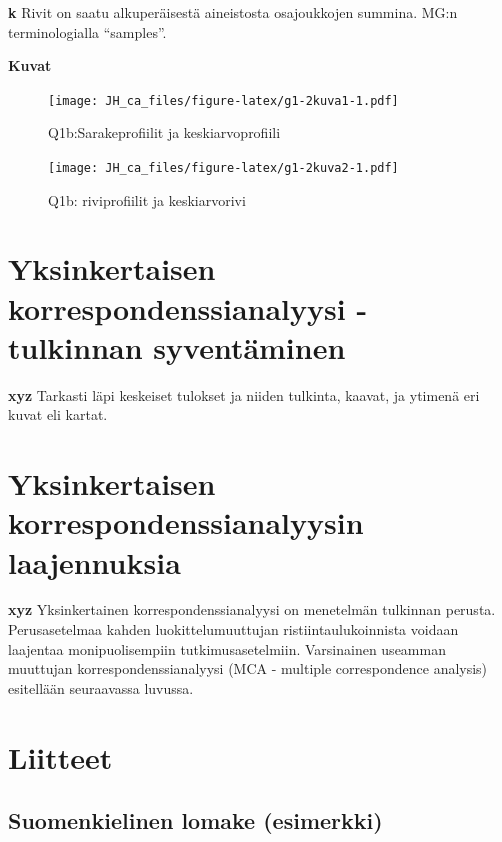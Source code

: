 \documentclass[
  finnish,
]{book}
\begin{document}
\textbf{k} Rivit on saatu alkuperäisestä aineistosta osajoukkojen summina. MG:n
terminologialla ``samples''.

\textbf{Kuvat}

\begin{figure}
\centering
\texttt{[image: JH\_ca\_files/figure-latex/g1-2kuva1-1.pdf]}
\caption{\label{fig:g1-2kuva1}Q1b:Sarakeprofiilit ja keskiarvoprofiili}
\end{figure}

\begin{figure}
\centering
\texttt{[image: JH\_ca\_files/figure-latex/g1-2kuva2-1.pdf]}
\caption{\label{fig:g1-2kuva2}Q1b: riviprofiilit ja keskiarvorivi}
\end{figure}

\hypertarget{yksinkertaisen-korrespondenssianalyysi---tulkinnan-syventuxe4minen}{%
\chapter{Yksinkertaisen korrespondenssianalyysi - tulkinnan syventäminen}\label{yksinkertaisen-korrespondenssianalyysi---tulkinnan-syventuxe4minen}}

\textbf{xyz} Tarkasti läpi keskeiset tulokset ja niiden tulkinta, kaavat, ja ytimenä eri kuvat eli kartat.

\hypertarget{yksinkertaisen-korrespondenssianalyysin-laajennuksia}{%
\chapter{Yksinkertaisen korrespondenssianalyysin laajennuksia}\label{yksinkertaisen-korrespondenssianalyysin-laajennuksia}}

\textbf{xyz} Yksinkertainen korrespondenssianalyysi on menetelmän tulkinnan perusta. Perusasetelmaa kahden luokittelumuuttujan ristiintaulukoinnista voidaan laajentaa monipuolisempiin tutkimusasetelmiin. Varsinainen useamman muuttujan korrespondenssianalyysi (MCA - multiple correspondence analysis) esitellään seuraavassa luvussa.

\hypertarget{liitteet}{%
\chapter*{Liitteet}\label{liitteet}}

\hypertarget{suomenkielinen-lomake-esimerkki}{%
\section{Suomenkielinen lomake (esimerkki)}\label{suomenkielinen-lomake-esimerkki}}
\end{document}
